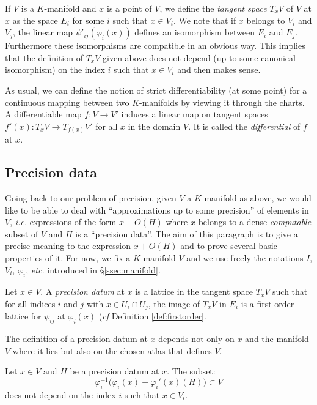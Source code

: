 \documentclass{lms}
\begin{document}
If $V$ is a $K$-manifold and $x$ is a point of $V$, we define the 
\emph{tangent space} $T_x V$ of $V$ at $x$ as the space $E_i$ for some 
$i$ such that $x \in V_i$. We note that if $x$ belongs to $V_i$ and 
$V_j$, the linear map $\psi'_{ij}(\varphi_i(x))$ defines an isomorphism 
between $E_i$ and $E_j$. Furthermore these isomorphisms are compatible 
in an obvious way. This implies that the definition of $T_x V$ given 
above does not depend (up to some canonical isomorphism) on the index 
$i$ such that $x \in V_i$ and then makes sense.

As usual, we can define the notion of strict differentiability (at some 
point) for a continuous mapping between two $K$-manifolds by viewing it 
through the charts. A  differentiable map $f : V \to V'$ induces 
a linear map on tangent spaces $f'(x) : T_x V \to T_{f(x)} V'$ for all 
$x$ in the domain $V$. It is called the \emph{differential} of $f$ at
$x$.

\subsection{Precision data}

Going back to our problem of precision, given $V$ a $K$-manifold as 
above, we would like to be able to deal with ``approximations up to some 
precision'' of elements in $V$, \emph{i.e.} expressions of the form $x + 
O(H)$ where $x$ belongs to a dense \emph{computable} subset of $V$ and 
$H$ is a ``precision data''.
The aim of this paragraph is to give a precise meaning to the expression 
$x + O(H)$ and to prove several basic properties of it.
For now, we fix a $K$-manifold $V$ and we use freely the notations $I$, 
$V_i$, $\varphi_i$, \emph{etc.} introduced in \S \ref{ssec:manifold}.

\begin{deftn}
Let $x \in V$.
A \emph{precision datum} at $x$ is a lattice in the tangent space 
$T_x V$ such that for all indices $i$ and $j$ with $x \in U_i \cap
U_j$, the image of $T_x V$ in $E_i$ is a first order lattice for
$\psi_{ij}$ at $\varphi_i(x)$ (\emph{cf} Definition \ref{def:firstorder}.
\end{deftn}

\begin{rmk}
The definition of a precision datum at $x$ depends not only on $x$
and the manifold $V$ where it lies but also on the chosen atlas that
defines $V$.
\end{rmk}

\begin{prop}
\label{prop:independence}
Let $x \in V$ and $H$ be a precision datum at $x$.
The subset:
$$\varphi_i^{-1}\big(\varphi_i(x) + \varphi_i'(x)(H)\big) 
\subset V$$
does not depend on the index $i$ such that $x \in V_i$.
\end{prop}
\end{document}

